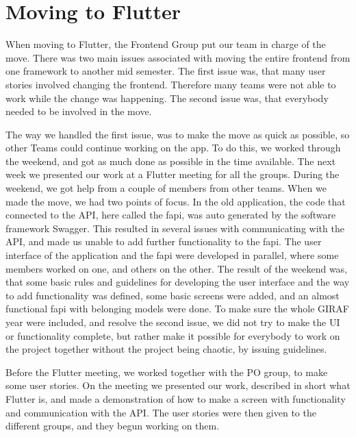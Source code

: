 \section{Moving to Flutter}
When moving to Flutter, the Frontend Group put our team in charge of the move. 
There was two main issues associated with moving the entire frontend from one framework to another mid semester.
The first issue was, that many user stories involved changing the frontend. Therefore many teams were not able to work while the change was happening.
The second issue was, that everybody needed to be involved in the move. 

The way we handled the first issue, was to make the move as quick as possible, so other Teams could continue working on the app. 
To do this, we worked through the weekend, and got as much done as possible in the time available. The next week we presented our work at a Flutter meeting for all the groups. 
During the weekend, we got help from a couple of members from other teams. 
When we made the move, we had two points of focus. In the old application, the code that connected to the API, here called the \gls{fapi}, was auto generated by the software framework Swagger.
This resulted in several issues with communicating with the API, and made us unable to add further functionality to the \gls{fapi}. 
The user interface of the application and the \gls{fapi} were developed in parallel, where some members worked on one, and others on the other. 
The result of the weekend was, that some basic rules and guidelines for developing the user interface and the way to add functionality was defined, some basic \glspl{screen} were added, and an almost functional \gls{fapi} with belonging models were done. 
To make sure the whole GIRAF year were included, and resolve the second issue, we did not try to make the UI or functionality complete, but rather make it possible for everybody to work on the project together without the project being chaotic, by issuing guidelines. 

Before the Flutter meeting, we worked together with the PO group, to make some user stories. 
On the meeting we presented our work, described in short what Flutter is, and made a demonstration of how to make a \gls{screen} with functionality and communication with the API.
The user stories were then given to the different groups, and they begun working on them. 